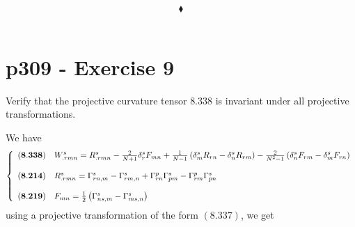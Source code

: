 $$\blacklozenge$$\\
\newpage


\section{p309 - Exercise 9}
\begin{tcolorbox}
Verify that the projective curvature tensor $\mathbf{8.338}$ is invariant under all projective transformations.
\end{tcolorbox}
We have
\begin{align*}
\left\{\begin{array}{ll}
\mathbf{(8.338)}&W^s_{.rmn}=R^s_{.rmn}-\frac{2}{N+1}\delta_r^s F_{mn}+\frac{1}{N-1}\left(\delta^s_m R_{rn}-\delta^s_n R_{rm}\right)-\frac{2}{N^2-1}\left(\delta^s_n F_{rm}-\delta^s_mF_{rn}\right)\\\\
\mathbf{(8.214)}&R^{s}_{.rmn} = \Gamma^{s}_{rn,m} - \Gamma^{s}_{rm,n}+\Gamma^{p}_{rn}\Gamma^{s}_{pm}-\Gamma^{p}_{rm}\Gamma^{s}_{pn}\\\\
\mathbf{(8.219)}&F_{mn} = \frac{1}{2}\left(\Gamma^{s}_{ns,m} - \Gamma^{s}_{ms,n}\right)\\
\end{array}
\right.
\end{align*}
using a projective transformation of the form $\mathbf{(8.337)}$, we get 

